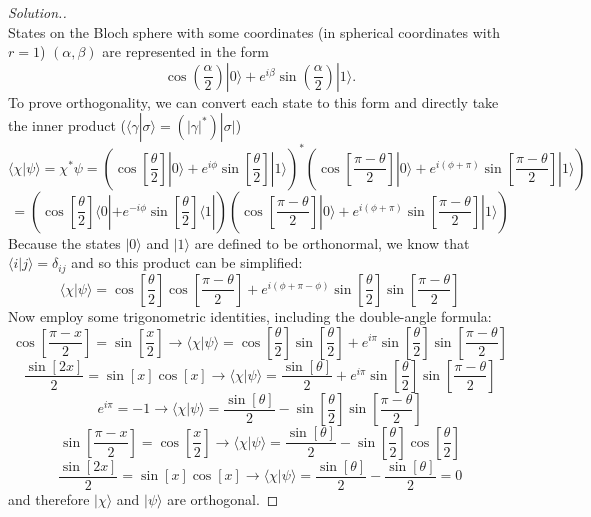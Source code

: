 \documentclass[12pt]{article}
\begin{document}
\begin{proof}[Solution.]~\\
States on the Bloch sphere with some coordinates (in spherical coordinates with
$r=1$) $(\alpha,\beta)$ are represented in the form
$$\cos\left(\frac{\alpha}{2}\right)|0\rangle+e^{i\beta}\sin\left(\frac{\alpha}{2}\right)|1\rangle.$$
To prove orthogonality, we can convert each state to this form and directly take
the inner product ($\langle\gamma|\sigma\rangle=(|\gamma|^*)|\sigma|$)
$$\langle\chi|\psi\rangle=\chi^*\psi=\left(\cos\left[\frac{\theta}{2}\right]|0\rangle+e^{i\phi}\sin\left[\frac{\theta}{2}\right]|1\rangle\right)^*\left(\cos\left[\frac{\pi-\theta}{2}\right]|0\rangle+e^{i(\phi+\pi)}\sin\left[\frac{\pi-\theta}{2}\right]|1\rangle\right)$$
$$=\left(\cos\left[\frac{\theta}{2}\right]\langle0|+e^{-i\phi}\sin\left[\frac{\theta}{2}\right]\langle1|\right)\left(\cos\left[\frac{\pi-\theta}{2}\right]|0\rangle+e^{i(\phi+\pi)}\sin\left[\frac{\pi-\theta}{2}\right]|1\rangle\right)$$
Because the states $|0\rangle$ and $|1\rangle$ are defined to be orthonormal, we know that
$\langle i|j\rangle=\delta_{ij}$ and so this product can be simplified:
$$\langle\chi|\psi\rangle=\cos\left[\frac{\theta}{2}\right]\cos\left[\frac{\pi-\theta}{2}\right]+e^{i(\phi+\pi-\phi)}\sin\left[\frac{\theta}{2}\right]\sin\left[\frac{\pi-\theta}{2}\right]$$
Now employ some trigonometric identities, including the double-angle formula:
$$\cos\left[\frac{\pi-x}{2}\right]=\sin\left[\frac{x}{2}\right]\to\langle\chi|\psi\rangle=\cos\left[\frac{\theta}{2}\right]\sin\left[\frac{\theta}{2}\right]+e^{i\pi}\sin\left[\frac{\theta}{2}\right]\sin\left[\frac{\pi-\theta}{2}\right]$$
$$\frac{\sin\left[2x\right]}{2}=\sin[x]\cos[x]\to\langle\chi|\psi\rangle=\frac{\sin[\theta]}{2}+e^{i\pi}\sin\left[\frac{\theta}{2}\right]\sin\left[\frac{\pi-\theta}{2}\right]$$
$$e^{i\pi}=-1\to\langle\chi|\psi\rangle=\frac{\sin[\theta]}{2}-\sin\left[\frac{\theta}{2}\right]\sin\left[\frac{\pi-\theta}{2}\right]$$
$$\sin\left[\frac{\pi-x}{2}\right]=\cos\left[\frac{x}{2}\right]\to\langle\chi|\psi\rangle=\frac{\sin[\theta]}{2}-\sin\left[\frac{\theta}{2}\right]\cos\left[\frac{\theta}{2}\right]$$
$$\frac{\sin\left[2x\right]}{2}=\sin[x]\cos[x]\to\langle\chi|\psi\rangle=\frac{\sin[\theta]}{2}-\frac{\sin[\theta]}{2}=0$$
and therefore $|\chi\rangle$ and $|\psi\rangle$ are orthogonal.
\end{proof}
 
\end{document}
